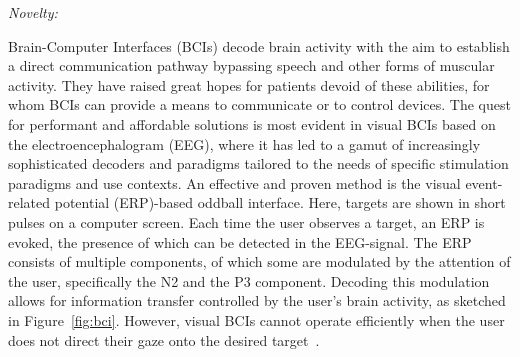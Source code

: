 


\emph{Novelty:}

Brain-Computer Interfaces (BCIs) decode brain activity with the aim to establish a direct communication
pathway bypassing speech and other forms of muscular activity. They have raised great hopes for patients
devoid of these abilities, for whom BCIs can provide a means to communicate or to
control devices.
The quest for performant and affordable solutions is most evident in
visual BCIs based on the electroencephalogram (EEG), where it has led to a gamut of increasingly sophisticated decoders
and paradigms tailored to the needs of specific stimulation paradigms and
use contexts.
An effective and proven method is the visual event-related potential (ERP)-based
oddball interface.
Here, targets are shown in short pulses on a computer screen.
Each time the user observes a target, an ERP is evoked, the presence of which can be
detected in the EEG-signal.
The ERP consists of multiple components, of which some are modulated by the
attention of the user, specifically the N2 and the P3 component.
Decoding this modulation allows for information transfer controlled by the
user's brain activity, as sketched in Figure~\ref{fig:bci}.
However, visual BCIs cannot operate efficiently when the user does not direct
their gaze onto the
desired target~\cite{Brunner2010}.

